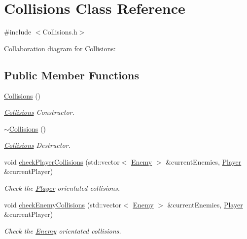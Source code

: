 \hypertarget{class_collisions}{}\section{Collisions Class Reference}
\label{class_collisions}


{\ttfamily \#include $<$Collisions.\+h$>$}



Collaboration diagram for Collisions\+:
\subsection*{Public Member Functions}
\begin{DoxyCompactItemize}
\item 
\hyperlink{class_collisions_a006630da4b62b10ebf123c6333c2b198}{Collisions} ()
\begin{DoxyCompactList}\small\item\em \hyperlink{class_collisions}{Collisions} Constructor. \end{DoxyCompactList}\item 
\hyperlink{class_collisions_a39a613fd2a130b096c616f74f776d2f9}{$\sim$\+Collisions} ()
\begin{DoxyCompactList}\small\item\em \hyperlink{class_collisions}{Collisions} Destructor. \end{DoxyCompactList}\item 
void \hyperlink{class_collisions_a990174c72f4771e6c2a8c014bd873513}{check\+Player\+Collisions} (std\+::vector$<$ \hyperlink{class_enemy}{Enemy} $>$ \&current\+Enemies, \hyperlink{class_player}{Player} \&current\+Player)
\begin{DoxyCompactList}\small\item\em Check the \hyperlink{class_player}{Player} orientated collisions. \end{DoxyCompactList}\item 
void \hyperlink{class_collisions_aa628e8ae15bab7e085e4962be22ff16e}{check\+Enemy\+Collisions} (std\+::vector$<$ \hyperlink{class_enemy}{Enemy} $>$ \&current\+Enemies, \hyperlink{class_player}{Player} \&current\+Player)
\begin{DoxyCompactList}\small\item\em Check the \hyperlink{class_enemy}{Enemy} orientated collisions. \end{DoxyCompactList}\end{DoxyCompactItemize}

